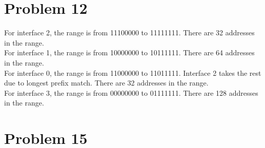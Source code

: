 \documentclass[titlepage, paper=a4, fontsize=11pt]{scrartcl} %
\numberwithin{equation}{section} %
\numberwithin{table}{section} %
\begin{document}

\section*{Problem 12}
For interface 2, the range is from 11100000 to 11111111. There are 32 addresses in the range. \\
For interface 1, the range is from 10000000 to 10111111. There are 64 addresses in the range. \\
For interface 0, the range is from 11000000 to 11011111. Interface 2 takes the rest due to longest prefix match. There are 32 addresses in the range. \\
For interface 3, the range is from 00000000 to 01111111. There are 128 addresses in the range. \\





\section*{Problem 15}
\end{document}

